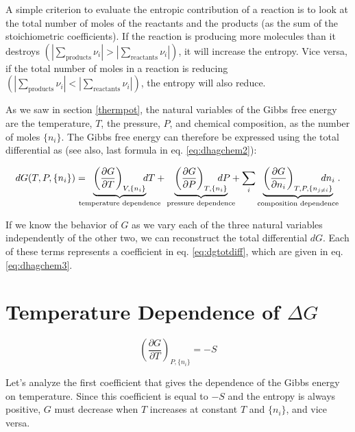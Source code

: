 \documentclass[
]{book}
\theoremstyle{definition}
\theoremstyle{definition}
\theoremstyle{definition}
\theoremstyle{remark}
\begin{document}
A simple criterion to evaluate the entropic contribution of a reaction is to look at the total number of moles of the reactants and the products (as the sum of the stoichiometric coefficients). If the reaction is producing more molecules than it destroys \(\left( \left| \sum_\text{products} \nu_i \right| > \left| \sum_\text{reactants} \nu_i \right| \right)\), it will increase the entropy. Vice versa, if the total number of moles in a reaction is reducing \(\left( \left| \sum_\text{products} \nu_i \right| < \left| \sum_\text{reactants} \nu_i \right| \right)\), the entropy will also reduce.

As we saw in section \ref{thermpot}, the natural variables of the Gibbs free energy are the temperature, \(T\), the pressure, \(P\), and chemical composition, as the number of moles \(\{n_i\}\). The Gibbs free energy can therefore be expressed using the total differential as (see also, last formula in eq. \eqref{eq:dhagchem2}):

\begin{equation}
dG(T,P,\{n_i\}) = \mkern-18mu \underbrace{\left(\frac{\partial G}{\partial T} \right)_{V,\{n_i\}}}_{\text{temperature dependence}} \mkern-36mu dT + \underbrace{\left(\frac{\partial G}{\partial P} \right)_{T,\{n_i\}}}_{\text{pressure dependence}} \mkern-36mu dP + \sum_i \underbrace{\left(\frac{\partial G}{\partial n_i} \right)_{T,P,\{n_{j \neq i}\}}}_{\text{composition dependence}} \mkern-36mu dn_i\;.
\label{eq:dgtotdiff}
\end{equation}

If we know the behavior of \(G\) as we vary each of the three natural variables independently of the other two, we can reconstruct the total differential \(dG\). Each of these terms represents a coefficient in eq. \eqref{eq:dgtotdiff}, which are given in eq. \eqref{eq:dhagchem3}.

\hypertarget{temperature-dependence-of-delta-g}{%
\section{\texorpdfstring{Temperature Dependence of \(\Delta G\)}{Temperature Dependence of \textbackslash Delta G}}\label{temperature-dependence-of-delta-g}}

\[
\left(\frac{\partial G}{\partial T} \right)_{P,\{n_i\}}=-S
\]

Let's analyze the first coefficient that gives the dependence of the Gibbs energy on temperature. Since this coefficient is equal to \(-S\) and the entropy is always positive, \(G\) must decrease when \(T\) increases at constant \(T\) and \(\{n_i\}\), and vice versa.
\end{document}
